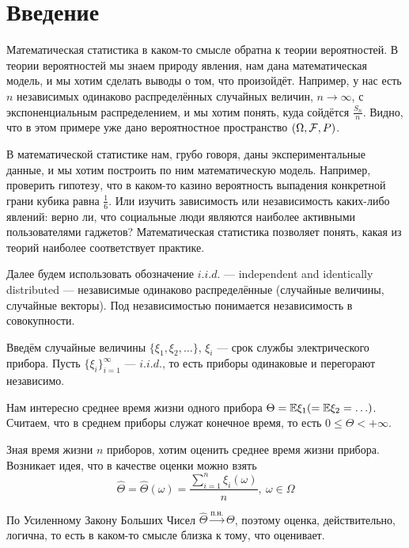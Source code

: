 \section{Введение}

\begin{note}
    Математическая статистика в каком-то смысле обратна к теории вероятностей. В теории вероятностей мы знаем природу явления, нам дана математическая модель, и мы хотим сделать выводы о том, что произойдёт. Например, у нас есть $n$ независимых одинаково распределённых случайных величин, $n \to \infty$, с экспоненциальным распределением, и мы хотим понять, куда сойдётся $\frac{S_n}{n}$. Видно, что в этом примере уже дано вероятностное пространство $(\Omega, \mathcal{F}, P)$.

    В математической статистике нам, грубо говоря, даны экспериментальные данные, и мы хотим построить по ним математическую модель. Например, проверить гипотезу, что в каком-то казино вероятность выпадения конкретной грани кубика равна $\frac{1}{6}$. Или изучить зависимость или независимость каких-либо явлений: верно ли, что социальные люди являются наиболее активными пользователями гаджетов? Математическая статистика позволяет понять, какая из теорий наиболее соответствует практике.
\end{note}

\begin{note}
    Далее будем использовать обозначение $i.i.d.$ --- independent and identically distributed --- независимые одинаково распределённые (случайные величины, случайные векторы). Под независимостью понимается независимость в совокупности.
\end{note}

\begin{example}
    Введём случайные величины $\{\xi_1, \xi_2, \hdots\}$, $\xi_i$ --- срок службы электрического прибора. Пусть $\{\xi_i\}_{i=1}^\infty$ --- $i.i.d.$, то есть приборы одинаковые и перегорают независимо.

    Нам интересно среднее время жизни одного прибора $\Theta = \mathbb{E}\xi_1 (= \mathbb{E}\xi_2 = \hdots)$. Считаем, что в среднем приборы служат конечное время, то есть $0 \le \Theta < +\infty$.

    Зная время жизни $n$ приборов, хотим оценить среднее время жизни прибора. Возникает идея, что в качестве оценки можно взять
    \[
        \hat{\Theta} = \hat{\Theta}(\omega) = \frac{\sum_{i=1}^n \xi_i(\omega)}{n},\ \omega \in \Omega
    \]

    По Усиленному Закону Больших Чисел $\hat{\Theta} \xrightarrow{\text{п.н.}} \Theta$, поэтому оценка, действительно, логична, то есть в каком-то смысле близка к тому, что оценивает.
\end{example}

